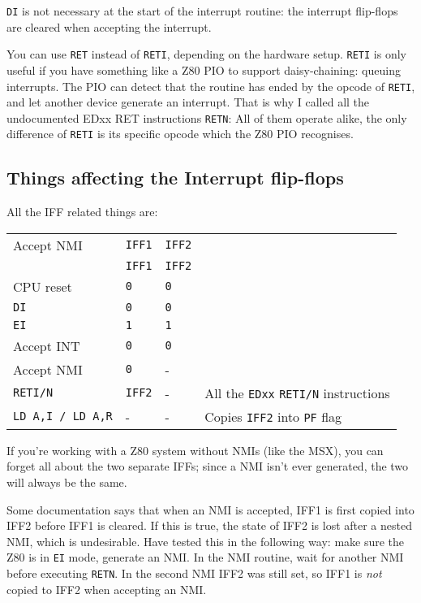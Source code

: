 \documentclass[twoside,openright,a4paper]{book}
\begin{document}
{\tt DI} is not necessary at the start of the interrupt routine: the interrupt flip-flops are cleared when accepting the interrupt.

You can use {\tt RET} instead of {\tt RETI}, depending on the hardware setup. {\tt RETI} is only useful if you have something like a Z80 PIO to support daisy-chaining: queuing interrupts. The PIO can detect that the routine has ended by the opcode of {\tt RETI}, and let another device generate an interrupt. That is why I called all the undocumented EDxx RET instructions {\tt RETN}: All of them operate alike, the only difference of {\tt RETI} is its specific opcode which the Z80 PIO recognises.


\subsection{Things affecting the Interrupt flip-flops}
\label{flipflop}

All the IFF related things are:

\begin{tabular}{llll}
	Accept NMI	& {\tt IFF1}	& {\tt IFF2} \\
				& {\tt IFF1}	& {\tt IFF2} \\
	CPU reset	& {\tt 0}		& {\tt 0}\\
	{\tt DI}	& {\tt 0}		& {\tt 0}\\
	{\tt EI}	& {\tt 1}		& {\tt 1}\\
	Accept INT	& {\tt 0}		& {\tt 0}\\
	Accept NMI	& {\tt 0}		& -\\
	{\tt RETI/N}& {\tt IFF2}	& - & All the {\tt EDxx} {\tt RETI/N} instructions\\
	{\tt LD A,I / LD A,R} & - & - & Copies {\tt IFF2} into {\tt PF} flag
\end{tabular}

If you're working with a Z80 system without NMIs (like the MSX), you can forget all about the two separate IFFs; since a NMI isn't ever generated, the two will always be the same. 

Some documentation says that when an NMI is accepted, IFF1 is first copied into IFF2 before IFF1 is cleared. If this is true, the state of IFF2 is lost after a nested NMI, which is undesirable. Have tested this in the following way: make sure the Z80 is in {\tt EI} mode, generate an NMI. In the NMI routine, wait for another NMI before executing {\tt RETN}. In the second NMI IFF2 was still set, so IFF1 is {\em not} copied to IFF2 when accepting an NMI.
\end{document}
